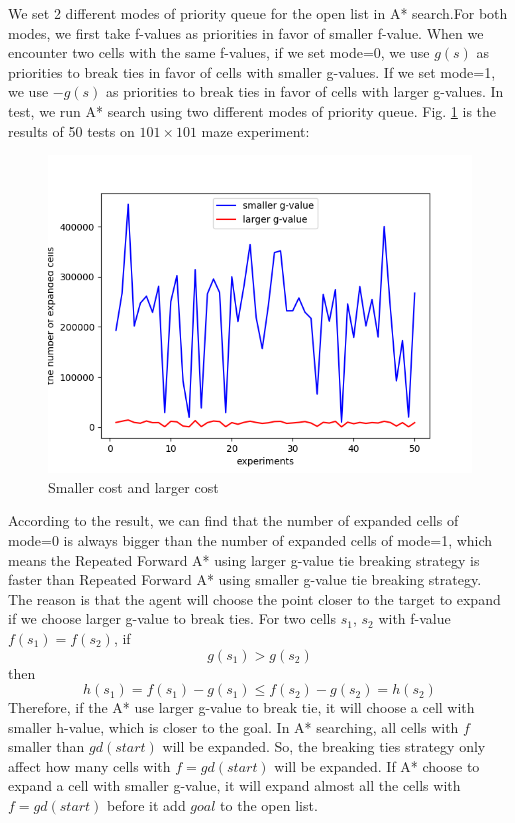 \documentclass[11pt]{article}
\begin{document}
We set 2 different modes of priority queue for the open list in A* search.For both modes, we first take f-values as priorities in favor of smaller f-value. When we encounter two cells with the same f-values, if we set mode=0,  we use $g(s)$ as priorities to break ties in favor of cells with smaller g-values. If we set mode=1, we use $-g(s)$ as priorities to break ties in favor of cells with larger g-values. In test, we run A* search using two different modes of priority queue. Fig. \ref{fig:Fig2.S&L} is the results of 50 tests on $101\times 101$ maze experiment:
\begin{figure}[htb]
	\centering
	\includegraphics[scale = 0.3]{smaller_g_and_larger_g.png}
	\caption{Smaller cost and larger cost}
	\label{fig:Fig2.S&L}
\end{figure}
\newline
According to the result, we can find that the number of expanded cells of mode=0 is always bigger than the number of expanded cells of mode=1, which means the Repeated Forward A* using larger g-value tie breaking strategy is faster than Repeated Forward A* using smaller g-value tie breaking strategy.\\
The reason is that the agent will choose the point closer to the target to expand if we choose larger g-value to break ties. For two cells $s_1$, $s_2$ with f-value $f(s_1)=f(s_2)$, if $$g(s_1)>g(s_2)$$
then
	$$h(s_1) = f(s_1) - g(s_1)
	\leq f(s_2) - g(s_2)
	=h(s_2)$$ 
Therefore, if the A* use larger g-value to break tie, it will choose a cell with smaller h-value, which is closer to the goal. In A* searching, all cells with $f$ smaller than $gd(start)$ will be expanded. So, the breaking ties strategy only affect how many cells with $f = gd(start)$ will be expanded. If A* choose to expand a cell with smaller g-value, it will expand almost all the cells with $f = gd(start)$ before it add $goal$ to the open list.
\end{document}
